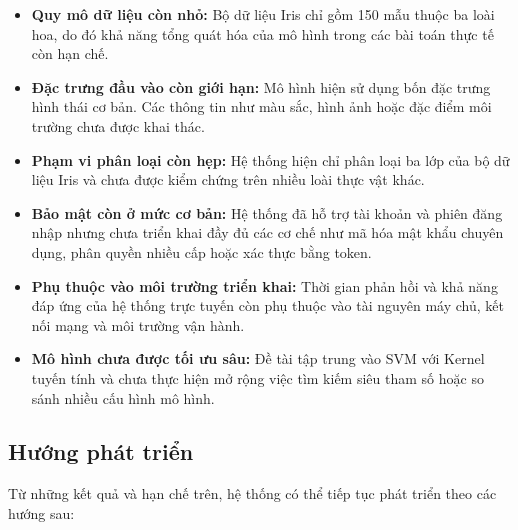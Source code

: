 \documentclass[14pt]{extarticle}
\begin{document}
\begin{itemize}[leftmargin=*]
	
	\item \textbf{Quy mô dữ liệu còn nhỏ:} Bộ dữ liệu Iris chỉ gồm 150 mẫu thuộc ba loài hoa, do đó khả năng tổng quát hóa của mô hình trong các bài toán thực tế còn hạn chế.
	
	\item \textbf{Đặc trưng đầu vào còn giới hạn:} Mô hình hiện sử dụng bốn đặc trưng hình thái cơ bản. Các thông tin như màu sắc, hình ảnh hoặc đặc điểm môi trường chưa được khai thác.
	
	\item \textbf{Phạm vi phân loại còn hẹp:} Hệ thống hiện chỉ phân loại ba lớp của bộ dữ liệu Iris và chưa được kiểm chứng trên nhiều loài thực vật khác.
	
	\item \textbf{Bảo mật còn ở mức cơ bản:} Hệ thống đã hỗ trợ tài khoản và phiên đăng nhập nhưng chưa triển khai đầy đủ các cơ chế như mã hóa mật khẩu chuyên dụng, phân quyền nhiều cấp hoặc xác thực bằng token.
	
	\item \textbf{Phụ thuộc vào môi trường triển khai:} Thời gian phản hồi và khả năng đáp ứng của hệ thống trực tuyến còn phụ thuộc vào tài nguyên máy chủ, kết nối mạng và môi trường vận hành.
	
	\item \textbf{Mô hình chưa được tối ưu sâu:} Đề tài tập trung vào SVM với Kernel tuyến tính và chưa thực hiện mở rộng việc tìm kiếm siêu tham số hoặc so sánh nhiều cấu hình mô hình.
	
\end{itemize}

\subsection{Hướng phát triển}

\noindent Từ những kết quả và hạn chế trên, hệ thống có thể tiếp tục phát triển theo các hướng sau:
\end{document}
